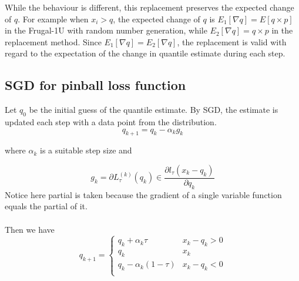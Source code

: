 \begin{enumerate}
    While the behaviour is different, this replacement preserves the expected change of $q$. 
    For example when $x_i > q$, 
    the expected change of $q$ is
    $E_1[\nabla q] = E[q \times p]$ in the Frugal-1U with 
    random number generation,
    while 
    $E_2[\nabla q] = q \times p$ in the replacement method.
    Since $E_1[\nabla q] = E_2[\nabla q]$, the replacement is valid
    with regard to the expectation of the change in quantile estimate during each step.

\end{enumerate}


\subsection{SGD for pinball loss function}
Let $q_0$ be the initial guess of the quantile estimate. 
By SGD, the estimate is updated each step with a data point from the distribution.
\begin{equation}
    q_{k+1} = q_k - \alpha_k g_k
\end{equation}

where $ \alpha_k $ is a suitable step size and 

\begin{equation}
    g_k = \partial L_{\tau}^{(k)}(q_k) \in \frac{\partial l_\tau(x_k - q_k)}{\partial q_k}
\end{equation}
{Notice here partial is taken because the gradient of a single variable function equals the partial of it.}
\\\\
Then we have
\begin{equation*}
    q_{k+1} = 
    \begin{cases}
        q_k + \alpha_k \tau               & x_k - q_k > 0\\
        q_k                               & x_k          \\
        q_k - \alpha_k (1-\tau)           & x_k - q_k < 0\\
    \end{cases}
\end{equation*}

